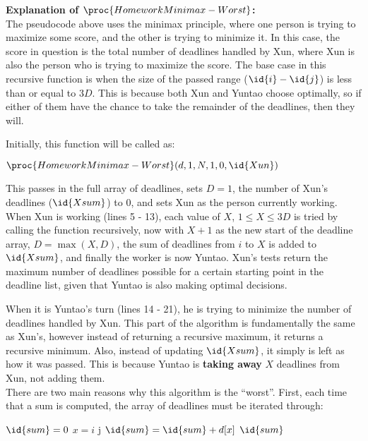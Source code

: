     \vspace{7mm}
    \textbf{Explanation of $\proc{HomeworkMinimax-Worst}$:}\\
    The pseudocode above uses the minimax principle, where one person is trying to maximize some score, and the other is trying to minimize it.
    In this case, the score in question is the total number of deadlines handled by Xun, where Xun is also the person who is trying to maximize the score.
    The base case in this recursive function is when the size of the passed range ($\id{i} - \id{j}$) is less than or equal to $3D$.
    This is because both Xun and Yuntao choose optimally, so if either of them have the chance to take the remainder of the deadlines, then they will.

    Initially, this function will be called as:
    \begin{center}
        $\proc{HomeworkMinimax-Worst}(d, 1, N, 1, 0, \id{Xun})$
    \end{center}
    This passes in the full array of deadlines, sets $D = 1$, the number of Xun's deadlines ($\id{Xsum}$) to 0, and sets Xun as the person currently working.
    When Xun is working (lines 5 - 13), each value of $X$, $1 \le X \le 3D$ is tried by calling the function recursively,
    now with $X + 1$ as the new start of the deadline array, $D = \max(X, D)$, the sum of deadlines from $i$ to $X$ is added to $\id{Xsum}$, and finally the worker is now Yuntao.
    Xun's tests return the maximum number of deadlines possible for a certain starting point in the deadline list, given that Yuntao is also making optimal decisions.

    When it is Yuntao's turn (lines 14 - 21), he is trying to minimize the number of deadlines handled by Xun.
    This part of the algorithm is fundamentally the same as Xun's, however instead of returning a recursive maximum, it returns a recursive minimum.
    Also, instead of updating $\id{Xsum}$, it simply is left as how it was passed. This is because Yuntao is \textbf{taking away} $X$ deadlines from Xun,
    not adding them. \\

    There are two main reasons why this algorithm is the ``worst''.
    First, each time that a sum is computed, the array of deadlines must be iterated through:

    \begin{spacing}{1.2}
        \begin{codebox}
            \li $\id{sum} = 0$
            \li \For $x = i$ \To j
            \Do
                \li $\id{sum} = \id{sum} + d[x]$
            \End
            \li \Return $\id{sum}$
        \end{codebox}
    \end{spacing}

